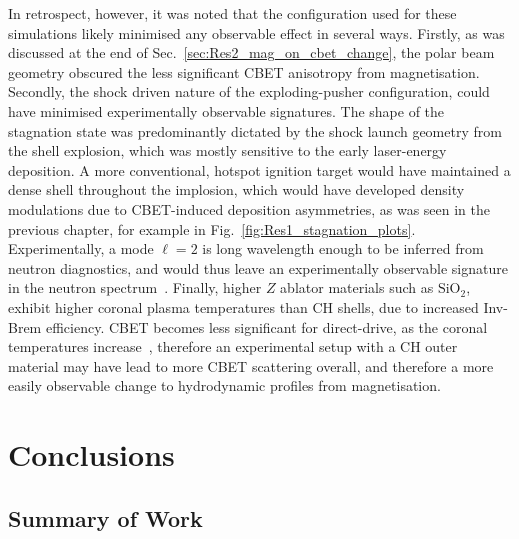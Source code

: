 In retrospect, however, it was noted that the configuration used for these simulations likely minimised any observable effect in several ways.
Firstly, as was discussed at the end of Sec.~\ref{sec:Res2_mag_on_cbet_change}, the polar beam geometry obscured the less significant \ac{CBET} anisotropy from magnetisation.
Secondly, the shock driven nature of the exploding-pusher configuration, could have minimised experimentally observable signatures.
The shape of the stagnation state was predominantly dictated by the shock launch geometry from the shell explosion, which was mostly sensitive to the early laser-energy deposition.
A more conventional, hotspot ignition target would have maintained a dense shell throughout the implosion, which would have developed density modulations due to \ac{CBET}-induced deposition asymmetries, as was seen in the previous chapter, for example in Fig.~\ref{fig:Res1_stagnation_plots}.
Experimentally, a mode $\ell=2$ is long wavelength enough to be inferred from neutron diagnostics, and would thus leave an experimentally observable signature in the neutron spectrum~\cite{woo_impact_2018,casey_three_2021}.
Finally, higher $Z$ ablator materials such as $\text{SiO}_2$, exhibit higher coronal plasma temperatures than CH shells, due to increased \ac{Inv-Brem} efficiency.
\ac{CBET} becomes less significant for direct-drive, as the coronal temperatures increase~\cite{colaitis_exploration_2023}, therefore an experimental setup with a CH outer material may have lead to more \ac{CBET} scattering overall, and therefore a more easily observable change to hydrodynamic profiles from magnetisation.

\section{Conclusions}%
\label{sec:Res2_conclusions}

\subsection{Summary of Work}%
\label{sec:Res2_summary}

